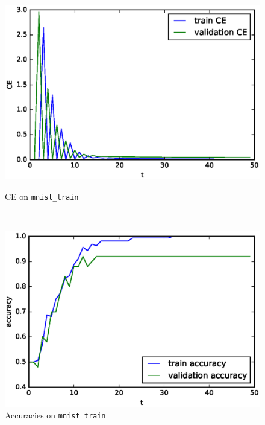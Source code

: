 \documentclass[10pt]{article}
\begin{document}
\begin{figure}[H]
\centering
\begin{minipage}[b]{0.45\textwidth}
\centering
\includegraphics[scale=.5]{plot_big_ce.eps}
\caption{CE on \texttt{mnist\_train}}
\label{plot_big_ce}
\end{minipage}
\
\begin{minipage}[b]{0.45\textwidth}
\centering
\includegraphics[scale=.5]{plot_big_acc.eps}
\caption{Accuracies on \texttt{mnist\_train}}
\label{plot_big_acc}
\end{minipage}
\end{figure}
\end{document}
